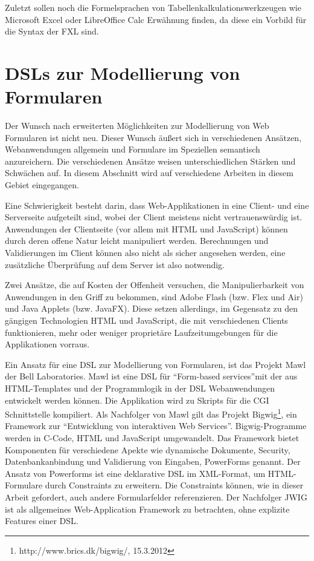 Zuletzt sollen noch die Formelsprachen von Tabellenkalkulationswerkzeugen wie Microsoft Excel oder LibreOffice Calc Erwähnung finden, da diese ein Vorbild für die Syntax der FXL sind.


\section{DSLs zur Modellierung von Formularen}

Der Wunsch nach erweiterten Möglichkeiten zur Modellierung von Web Formularen ist nicht neu. Dieser Wunsch äußert sich in verschiedenen Ansätzen, Webanwendungen allgemein und Formulare im Speziellen semantisch anzureichern. Die verschiedenen Ansätze weisen unterschiedlichen Stärken und Schwächen auf. In diesem Abschnitt wird auf verschiedene Arbeiten in diesem Gebiet eingegangen.

Eine Schwierigkeit besteht darin, dass Web-Applikationen in eine Client- und eine Serverseite aufgeteilt sind, wobei der Client meistens nicht vertrauenswürdig ist. Anwendungen der Clientseite (vor allem mit HTML und Java\-Script) können durch deren offene Natur leicht manipuliert werden. Berechnungen und Validierungen im Client können also nicht als sicher angesehen werden, eine zusätzliche Überprüfung auf dem Server ist also not\-wen\-dig. 

Zwei Ansätze, die auf Kosten der Offenheit versuchen, die Manipulierbarkeit von Anwendungen in den Griff zu bekommen, sind Adobe Flash (bzw. Flex und Air) und Java Applets (bzw. JavaFX). Diese setzen allerdings, im Gegensatz zu den gängigen Technologien HTML und Java\-Script, die mit verschiedenen Clients funktionieren, mehr oder weniger proprietäre Laufzeitumgebungen für die Applikationen vorraus.

Ein Ansatz für eine DSL zur Modellierung von Formularen, ist das Projekt Mawl der Bell Laboratories\cite{AtBa99}. Mawl ist eine DSL für ``Form-based services''mit der aus HTML-Templates und der Programmlogik in der DSL Webanwendungen entwickelt werden können. Die Applikation wird zu Skripts für die CGI Schnittstelle kompiliert. Als Nachfolger von Mawl gilt das Projekt Bigwig\footnote{http://www.brics.dk/bigwig/, 15.3.2012}, ein Framework zur ``Entwicklung von interaktiven Web Services''. Bigwig-Programme werden in C-Code, HTML und Java\-Script umgewandelt. Das Framework bietet Komponenten für verschiedene Apekte wie dynamische Dokumente, Security, Datenbankanbindung und Validierung von Eingaben, PowerForms genannt. Der Ansatz von Powerforms\cite{BrMo00} ist eine deklarative DSL im XML-Format, um HTML-Formulare durch Constraints zu erweitern. Die Constraints können, wie in dieser Arbeit gefordert, auch andere Formularfelder referenzieren. Der Nachfolger JWIG ist als allgemeines Web-Application Framework zu betrachten, ohne explizite Features einer DSL.

